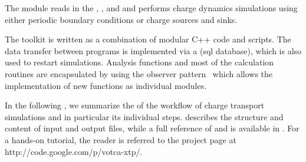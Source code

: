 The   module reads in the 
, , and 
 and performs charge dynamics simulations using 
either periodic boundary conditions or charge sources and sinks. 

The toolkit is written as a combination of modular C++ code and scripts. The 
data transfer between programs is implemented via a  (sql database), which is also used to restart simulations. Analysis 
functions and most of the calculation routines are encapsulated by using the 
observer pattern~\cite{gamma_design_1995} which allows the implementation of new 
functions as individual modules.

In the following , we summarize the  of the workflow of charge transport simulations and in particular 
its individual steps.  describes the structure and content of input and 
output files, while a full reference of  and 
 is available in . For a 
hands-on tutorial, the reader is referred to the 
\hyperref[http://code.google.com/p/votca-xtp/]{\votcaxtp} project page at 
http://code.google.com/p/votca-xtp/.



